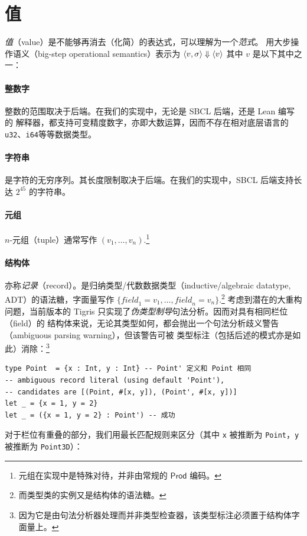 \section{值}
\emph{值}（value）是不能够再消去（化简）的表达式，可以理解为一个\emph{范式}。
用大步操作语义（big-step operational semantics）表示为
\(\langle v, \sigma \rangle \Downarrow \langle v \rangle\) 其中 \(v\) 是以下其中之一：
{\setlength{\parskip}{-1em}
  \paragraph*{整数字} 整数的范围取决于后端。在我们的实现中，无论是 SBCL 后端，还是 Lean 编写的
  解释器，都支持可变精度数字，亦即大数运算，因而不存在相对底层语言的\texttt{u32}、\texttt{i64}等等数据类型。
  \paragraph*{字符串} 是字符的无穷序列。其长度限制取决于后端。在我们的实现中，SBCL 后端支持长达 $2^{45}$ 的字符串。
  \paragraph*{元组} \(n\)-元组（tuple）通常写作 \((v_1,\dots,v_n)\).\footnote{元组在实现中是特殊对待，并非由常规的 $\mathsf{Prod}$ 编码。}
  \paragraph*{结构体} 亦称\emph{记录}（record）。是归纳类型/代数数据类型（inductive/algebraic datatype, ADT）的语法糖，字面量写作
  \(\{\textit{field}_1 = v_1,\dots,\textit{field}_n=v_n\}\).\footnote{而类型类的实例又是结构体的语法糖。}
  考虑到潜在的大重构问题，当前版本的 Tigris 只实现了\emph{伪类型制导}句法分析。因而对具有相同栏位（field）的
  结构体来说，无论其类型如何，都会抛出一个句法分析歧义警告（ambiguous parsing warning），但该警告可被
  类型标注（包括后述的模式亦是如此）消除：\footnote{
    因为它是由句法分析器处理而并非类型检查器，该类型标注必须置于结构体字面量上。
}}
\begin{verbatim}
type Point  = {x : Int, y : Int} -- Point' 定义和 Point 相同
-- ambiguous record literal (using default 'Point'),
-- candidates are [(Point, #[x, y]), (Point', #[x, y])]
let _ = {x = 1, y = 2}
let _ = ({x = 1, y = 2} : Point') -- 成功
\end{verbatim}
对于栏位有重叠的部分，我们用最长匹配规则来区分（其中 \texttt{x} 被推断为 \texttt{Point}，\texttt{y} 被推断为 \texttt{Point3D}）：
